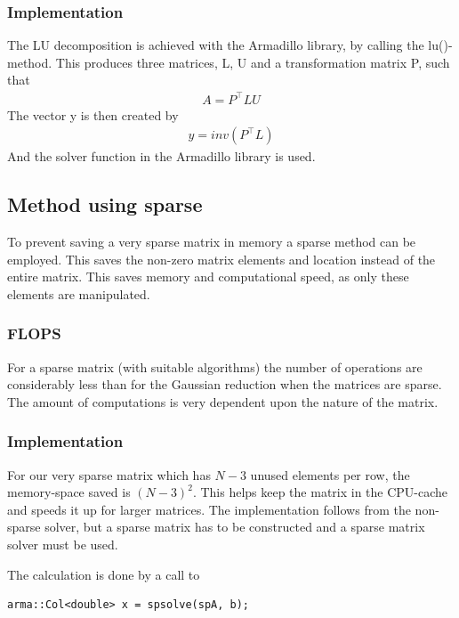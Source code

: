 \documentclass[11pt,a4paper,english,draft]{article}
\numberwithin{equation}{section}
\newcommand{\trans}[1]{#1^\top}
\begin{document}
\subsubsection{Implementation}

The LU decomposition is achieved with the Armadillo library, by calling
the lu()-method. This produces three matrices, L, U and a transformation
matrix P, such that
\begin{gather}
A = \trans{P}LU
\end{gather}
The vector y is then created by
\begin{gather}
y = inv\left(\trans{P}L  \right)
\end{gather}
And the solver function in the Armadillo library is used.

\subsection{Method using sparse}

To prevent saving a very sparse matrix in memory a sparse method can be employed.
This saves the non-zero matrix elements and location instead of the 
entire matrix. This saves memory and computational speed, as only these
elements are manipulated.

\subsubsection{FLOPS}

For a sparse matrix (with suitable algorithms) the number of operations are considerably
less than for the Gaussian reduction when the matrices are sparse.
The amount of computations is very dependent upon the nature of the matrix.

\subsubsection{Implementation}

For our very sparse matrix which has $N-3$ unused elements per row, the
memory-space saved is $(N-3)^2$. This helps keep the matrix in the 
CPU-cache and speeds it up for larger matrices. The implementation follows
from the non-sparse solver, but a sparse matrix has to be constructed and 
a sparse matrix solver must be used.

The calculation is done by a call to
\begin{lstlisting}
arma::Col<double> x = spsolve(spA, b);
\end{lstlisting}
\end{document}
